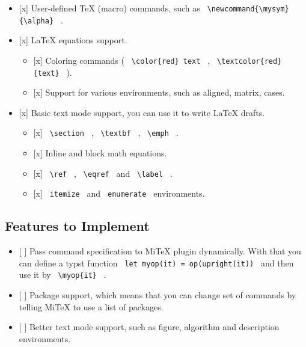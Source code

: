\begin{itemize}
\tightlist
\item
  {[}x{]} User-defined TeX (macro) commands, such as
  \texttt{\ \textbackslash{}newcommand\{\textbackslash{}mysym\}\{\textbackslash{}alpha\}\ }
  .
\item
  {[}x{]} LaTeX equations support.

  \begin{itemize}
  \tightlist
  \item
    {[}x{]} Coloring commands (
    \texttt{\ \textbackslash{}color\{red\}\ text\ } ,
    \texttt{\ \textbackslash{}textcolor\{red\}\{text\}\ } ).
  \item
    {[}x{]} Support for various environments, such as aligned, matrix,
    cases.
  \end{itemize}
\item
  {[}x{]} Basic text mode support, you can use it to write LaTeX drafts.

  \begin{itemize}
  \tightlist
  \item
    {[}x{]} \texttt{\ \textbackslash{}section\ } ,
    \texttt{\ \textbackslash{}textbf\ } ,
    \texttt{\ \textbackslash{}emph\ } .
  \item
    {[}x{]} Inline and block math equations.
  \item
    {[}x{]} \texttt{\ \textbackslash{}ref\ } ,
    \texttt{\ \textbackslash{}eqref\ } and
    \texttt{\ \textbackslash{}label\ } .
  \item
    {[}x{]} \texttt{\ itemize\ } and \texttt{\ enumerate\ }
    environments.
  \end{itemize}
\end{itemize}

\subsection{Features to Implement}\label{features-to-implement}

\begin{itemize}
\tightlist
\item
  {[} {]} Pass command specification to MiTeX plugin dynamically. With
  that you can define a typst function
  \texttt{\ let\ myop(it)\ =\ op(upright(it))\ } and then use it by
  \texttt{\ \textbackslash{}myop\{it\}\ } .
\item
  {[} {]} Package support, which means that you can change set of
  commands by telling MiTeX to use a list of packages.
\item
  {[} {]} Better text mode support, such as figure, algorithm and
  description environments.
\end{itemize}

